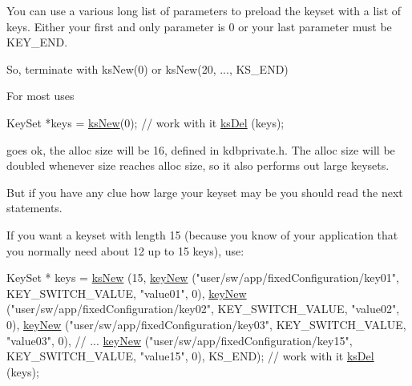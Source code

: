 You can use a various long list of parameters to preload the keyset with a list of keys. Either your first and only parameter is 0 or your last parameter must be K\-E\-Y\-\_\-\-E\-N\-D.

So, terminate with ks\-New(0) or ks\-New(20, ..., K\-S\-\_\-\-E\-N\-D)

For most uses 
\begin{DoxyCode}
KeySet *keys = \hyperlink{group__keyset_ga671e1aaee3ae9dc13b4834a4ddbd2c3c}{ksNew}(0);
\textcolor{comment}{// work with it}
\hyperlink{group__keyset_ga27e5c16473b02a422238c8d970db7ac8}{ksDel} (keys);
\end{DoxyCode}
 goes ok, the alloc size will be 16, defined in kdbprivate.\-h. The alloc size will be doubled whenever size reaches alloc size, so it also performs out large keysets.

But if you have any clue how large your keyset may be you should read the next statements.

If you want a keyset with length 15 (because you know of your application that you normally need about 12 up to 15 keys), use\-: 
\begin{DoxyCode}
KeySet * keys = \hyperlink{group__keyset_ga671e1aaee3ae9dc13b4834a4ddbd2c3c}{ksNew} (15,
        \hyperlink{group__key_gaf6893c038b3ebee90c73a9ea8356bebf}{keyNew} (\textcolor{stringliteral}{"user/sw/app/fixedConfiguration/key01"}, KEY\_SWITCH\_VALUE,
       \textcolor{stringliteral}{"value01"}, 0),
        \hyperlink{group__key_gaf6893c038b3ebee90c73a9ea8356bebf}{keyNew} (\textcolor{stringliteral}{"user/sw/app/fixedConfiguration/key02"}, KEY\_SWITCH\_VALUE,
       \textcolor{stringliteral}{"value02"}, 0),
        \hyperlink{group__key_gaf6893c038b3ebee90c73a9ea8356bebf}{keyNew} (\textcolor{stringliteral}{"user/sw/app/fixedConfiguration/key03"}, KEY\_SWITCH\_VALUE,
       \textcolor{stringliteral}{"value03"}, 0),
        \textcolor{comment}{// ...}
        \hyperlink{group__key_gaf6893c038b3ebee90c73a9ea8356bebf}{keyNew} (\textcolor{stringliteral}{"user/sw/app/fixedConfiguration/key15"}, KEY\_SWITCH\_VALUE,
       \textcolor{stringliteral}{"value15"}, 0),
        KS\_END);
\textcolor{comment}{// work with it}
\hyperlink{group__keyset_ga27e5c16473b02a422238c8d970db7ac8}{ksDel} (keys);
\end{DoxyCode}


